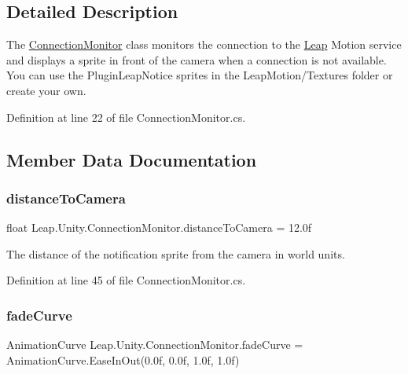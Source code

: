 \subsection{Detailed Description}
The \mbox{\hyperlink{class_leap_1_1_unity_1_1_connection_monitor}{Connection\+Monitor}} class monitors the connection to the \mbox{\hyperlink{namespace_leap_1_1_unity_1_1_leap}{Leap}} Motion service and displays a sprite in front of the camera when a connection is not available. You can use the Plugin\+Leap\+Notice sprites in the Leap\+Motion/\+Textures folder or create your own. 

Definition at line 22 of file Connection\+Monitor.\+cs.



\subsection{Member Data Documentation}
\mbox{\label{class_leap_1_1_unity_1_1_connection_monitor_a27395c8e84ea84e79eef408e0581ef34}} 
\subsubsection{\texorpdfstring{distanceToCamera}{distanceToCamera}}
{\footnotesize\ttfamily float Leap.\+Unity.\+Connection\+Monitor.\+distance\+To\+Camera = 12.\+0f}

The distance of the notification sprite from the camera in world units. 

Definition at line 45 of file Connection\+Monitor.\+cs.

\mbox{\label{class_leap_1_1_unity_1_1_connection_monitor_aa129df8f4e78c2d5700608370f0d27d1}} 
\subsubsection{\texorpdfstring{fadeCurve}{fadeCurve}}
{\footnotesize\ttfamily Animation\+Curve Leap.\+Unity.\+Connection\+Monitor.\+fade\+Curve = Animation\+Curve.\+Ease\+In\+Out(0.\+0f, 0.\+0f, 1.\+0f, 1.\+0f)}

